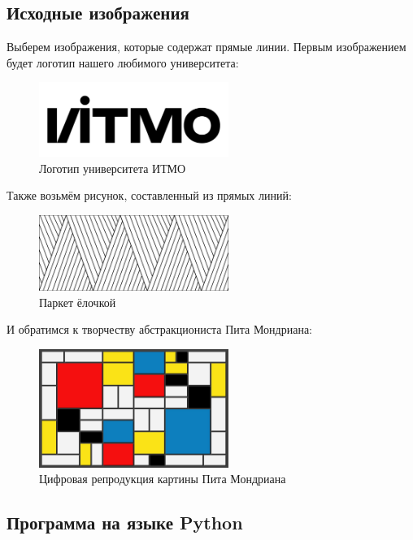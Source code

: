 \subsection{Исходные изображения}
Выберем изображения, которые содержат прямые линии. Первым изображением будет логотип нашего любимого университета:
\begin{figure}[ht!]
    \centering
    \includegraphics[width=0.55\textwidth]{images/lines/source/ITMO_LOGO.jpeg}
    \caption{Логотип университета ИТМО}
    \label{img:src_logo}
\end{figure} 

Также возьмём рисунок, составленный из прямых линий:

\begin{figure}[ht!]
    \centering
    \includegraphics[width=0.55\textwidth]{images/lines/source/wovenlinesfinal.jpeg}
    \caption{Паркет ёлочкой}
    \label{img:src_fir}
\end{figure} 

И обратимся к творчеству абстракциониста Пита Мондриана:

\begin{figure}[ht!]
    \centering
    \includegraphics[width=0.55\textwidth]{images/lines/source/Piet_Mondriaan_-_03.jpg}
    \caption{Цифровая репродукция картины Пита Мондриана}
    \label{img:src_piet}
\end{figure} 

\subsection{Программа на языке Python}


